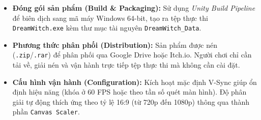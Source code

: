 \documentclass[../DoAn.tex]{subfiles}
\begin{document}
\begin{itemize}
    \item \textbf{Đóng gói sản phẩm (Build \& Packaging):} Sử dụng \textit{Unity Build Pipeline} để biên dịch sang mã máy Windows 64-bit, tạo ra tệp thực thi \texttt{DreamWitch.}\allowbreak\texttt{exe} kèm thư mục tài nguyên \texttt{DreamWitch\_Data}.
    \item \textbf{Phương thức phân phối (Distribution):} Sản phẩm được nén (\texttt{.zip}/\texttt{.rar}) để phân phối qua Google Drive hoặc Itch.io. Người chơi chỉ cần tải về, giải nén và vận hành trực tiếp tệp thực thi mà không cần cài đặt.
    \item \textbf{Cấu hình vận hành (Configuration):} Kích hoạt mặc định V-Sync giúp ổn định hiệu năng (khóa ở 60 FPS hoặc theo tần số quét màn hình). Độ phân giải tự động thích ứng theo tỷ lệ 16:9 (từ 720p đến 1080p) thông qua thành phần \texttt{Canvas Scaler}.
\end{itemize}
\end{document}
